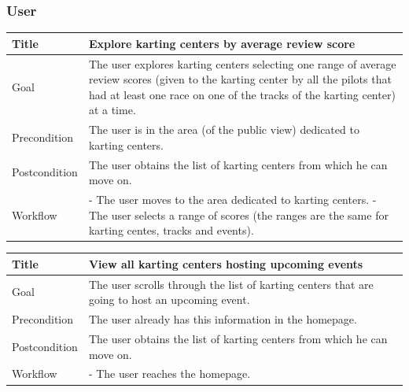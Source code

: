 \documentclass{beamer}
\begin{document}

\begin{frame}
    \frametitle{User}
    \begin{table}
        \tiny
        \begin{tabular}{|p{2cm}|p{6cm}|}
        \hline
        Title & \textbf{Explore karting centers by average review score} \\
        \hline
        Goal & The user explores karting centers selecting one range of average review scores (given to the karting center by all the pilots
        that had at least one race on one of the tracks of the karting center) at a time. \\
        \hline
        Precondition & The user is in the area (of the public view) dedicated to karting centers.\\
        \hline
        Postcondition & The user obtains the list of karting centers from which he can move on.\\
        \hline
        Workflow &
        - The user moves to the area dedicated to karting centers. \newline
        - The user selects a range of scores (the ranges are the same for karting centes, tracks and events). \\
        \hline
        \end{tabular}
\end{table}

\begin{table}
    \tiny
    \begin{tabular}{|p{2cm}|p{6cm}|}
    \hline
    Title & \textbf{View all karting centers hosting upcoming events} \\
    \hline
    Goal & The user scrolls through the list of karting centers that are going to host an upcoming event. \\
    \hline
    Precondition & The user already has this information in the homepage.\\
    \hline
    Postcondition & The user obtains the list of karting centers from which he can move on.\\
    \hline
    Workflow &
    - The user reaches the homepage. \\
    \hline
    \end{tabular}
\end{table}
\end{frame}

\end{document}
